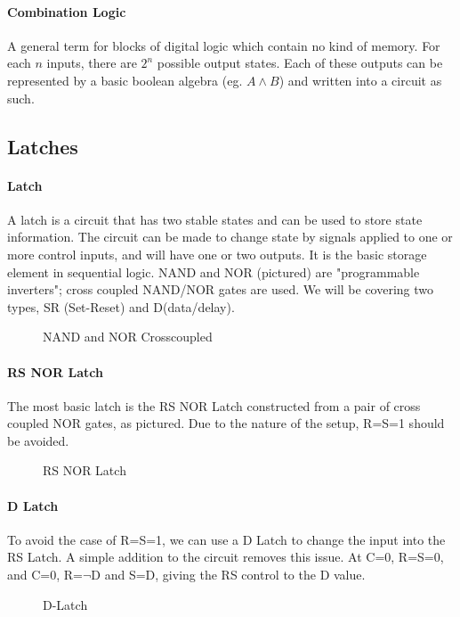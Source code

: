 \paragraph{Combination Logic} A general term for blocks of digital logic which contain no kind of memory. For each $n$ inputs, there are $2^n$ possible output states. Each of these outputs can be represented by a basic boolean algebra (eg. $A\wedge B$) and written into a circuit as such.
\subsection{Latches}
\paragraph{Latch} A latch is a circuit that has two stable states and can be used to store state information. The circuit can be made to change state by signals applied to one or more control inputs, and will have one or two outputs. It is the basic storage element in sequential logic. NAND and NOR (pictured) are "programmable inverters"; cross coupled NAND/NOR gates are used. We will be covering two types, SR (Set-Reset) and D(data/delay).
\begin{figure}[!htb]
	\caption{\label{fig:nandnor} NAND and NOR Crosscoupled}
\end{figure}
\paragraph{RS NOR Latch} The most basic latch is the RS NOR Latch constructed from a pair of cross coupled NOR gates, as pictured. Due to the nature of the setup, R=S=1 should be avoided.
\begin{figure}[!htb]
	\caption{\label{fig:norlatch} RS NOR Latch}
\end{figure}
\paragraph{D Latch} To avoid the case of R=S=1, we can use a D Latch to change the input into the RS Latch. A simple addition to the circuit removes this issue. At C=0, R=S=0, and C=0, R=$\neg$D and S=D, giving the RS control to the D value.
\begin{figure}[!htb]
	\caption{\label{fig:dlatch} D-Latch}
\end{figure}
